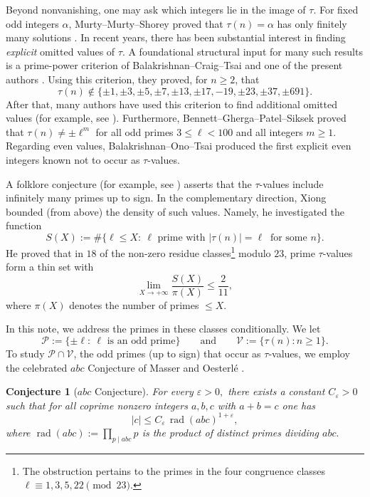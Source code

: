 \documentclass[12pt]{amsart}
\newtheorem*{conjecture}{Conjecture}
\newcommand{\rad}{\operatorname{rad}}
\theoremstyle{remark}
\numberwithin{equation}{section}
\begin{document}
Beyond nonvanishing, one may ask which integers lie in the image of $\tau$.
For fixed odd integers $\alpha$, Murty--Murty--Shorey proved that $\tau(n)=\alpha$ has only finitely many
solutions \cite{MurtyMurtyShorey1987}. In recent years, there has been substantial interest in finding
\emph{explicit} omitted values of $\tau$. A foundational structural input for many such results is a
prime-power criterion of Balakrishnan--Craig--Tsai and one of the present authors \cite{BCOT2023}.
Using this criterion, they \cite{BCOT2023} proved, for $n\ge 2$, that
\[
\tau(n)\notin\{\pm 1,\pm 3,\pm 5,\pm 7,\pm 13,\pm 17,-19,\pm 23,\pm 37,\pm 691\}.
\]
After that, many authors have used this criterion to find additional omitted values (for example, see \cite{AmirHong2022, DembnerJain2021, HanadaMadhukara2021}).
Furthermore, Bennett--Gherga--Patel--Siksek \cite{BGPSS2022}
proved that $\tau(n)\neq \pm \ell^m$ for all odd primes $3\le \ell<100$ and all integers $m\ge 1$.
Regarding even values, Balakrishnan--Ono--Tsai \cite{BalakrishnanOnoTsai2022} produced the first explicit even
integers known not to occur as $\tau$-values.

A folklore conjecture (for example, see \cite{BGPSS2022, LygerosRozier2013}) asserts that the $\tau$-values include infinitely many primes up to sign.
In the complementary direction, Xiong \cite{Xiong2025} bounded (from above) the density of such values.
Namely, he investigated the function
\begin{equation}\label{Count}
S(X):=\#\{\ell\le X:\ \ell \text{ prime with } |\tau(n)|=\ell\ \text{ for some } n\}.
\end{equation}
He proved that in $18$ of the non-zero residue classes\footnote{The obstruction pertains
to the primes in the four congruence classes
$\ell\equiv 1,3,5,22\pmod{23}.$}
 modulo $23$, prime $\tau$-values form a thin set with
$$
\lim_{X\rightarrow +\infty} \frac{S(X)}{\pi(X)} \leq \frac{2}{11},
$$
where $\pi(X)$ denotes the number of primes $\leq X.$

In this note, we address the primes in these classes conditionally.
We let
\begin{equation}
\mathcal P:=\{\pm \ell:\ \ell \text{ is an odd prime}\}
\qquad  {\text {and}} \qquad
\mathcal V:=\{\tau(n):n\ge 1\}.
\end{equation}
To study $\mathcal P\cap \mathcal V$, the odd primes (up to sign) that occur as $\tau$-values,
we employ the celebrated $abc$ Conjecture of Masser and Oesterl\'e \cite[Exp.~694]{Oesterle1988}.


\begin{conjecture}[$abc$ Conjecture]\label{conj:abc}
For every $\varepsilon>0,$ there exists a constant $C_\varepsilon>0$ such that
for all coprime nonzero integers
$a, b, c$ with $a+b=c$ one has
\[
|c|\le C_\varepsilon\, \rad(abc)^{1+\varepsilon},
\]
where $\rad(abc):=\prod_{p\mid abc} p$ is the product of distinct primes dividing $abc.$
\end{conjecture}
\end{document}
